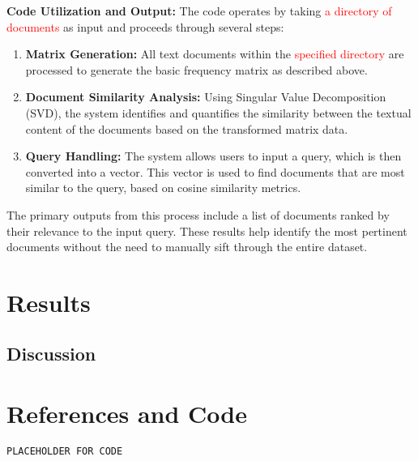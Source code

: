 \documentclass[12pt,a4paper]{article}
\begin{document}
\bigskip
\noindent \textbf{Code Utilization and Output:}
\noindent The code operates by taking \textcolor{red}{a directory of documents} as input and proceeds through several steps:
\begin{enumerate}
    \item \textbf{Matrix Generation:} All text documents within the \textcolor{red}{specified directory} are processed to generate the basic frequency matrix as described above.
    \item \textbf{Document Similarity Analysis:} Using Singular Value Decomposition (SVD), the system identifies and quantifies the similarity between the textual content of the documents based on the transformed matrix data.
    \item \textbf{Query Handling:} The system allows users to input a query, which is then converted into a vector. This vector is used to find documents that are most similar to the query, based on cosine similarity metrics.
\end{enumerate}
The primary outputs from this process include a list of documents ranked by their relevance to the input query. These results help identify the most pertinent documents without the need to manually sift through the entire dataset.




\newpage
\section{Results}



\newpage
\subsection{Discussion}

\newpage
\section{References and Code}

\begin{lstlisting}[style=Matlab-Pyglike]
PLACEHOLDER FOR CODE
\end{lstlisting}
\end{document}
